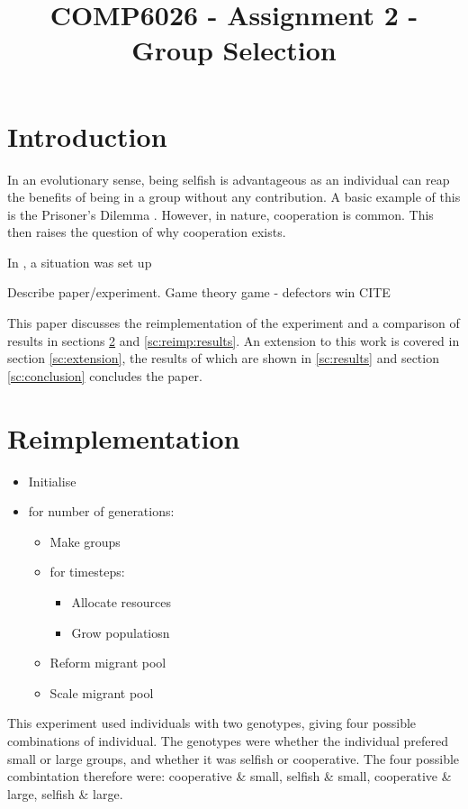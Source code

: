 \documentclass[11pt]{ecsarticle}
\title{COMP6026 - Assignment 2 - Group Selection}
\begin{document}
\maketitle
 
\section{Introduction}

In an evolutionary sense, being selfish is advantageous \cite{} as an individual can reap the benefits of being in a group without any contribution.
A basic example of this is the Prisoner's Dilemma \cite{}.
However, in nature, cooperation is common. 
This then raises the question of why cooperation exists. 

In \cite{powers2007individual}, a situation was set up

Describe paper/experiment.
Game theory game - defectors win CITE

This paper discusses the reimplementation of the experiment \cite{powers2007individual} and a comparison of results in sections \ref{sc:reimplementation} and \ref{sc:reimp:results}.
An extension to this work is covered in section \ref{sc:extension}, the results of which are shown in \ref{sc:results} and section \ref{sc:conclusion} concludes the paper.


\section{Reimplementation}\label{sc:reimplementation}
\begin{itemize}
 \item Initialise
 \item for number of generations:
 \begin{itemize}
  \item Make groups
  \item for timesteps:
  \begin{itemize}
   \item Allocate resources
   \item Grow populatiosn
  \end{itemize}
  \item Reform migrant pool
  \item Scale migrant pool
 \end{itemize}

\end{itemize}


This experiment used individuals with two genotypes, giving four possible combinations of individual.
The genotypes were whether the individual prefered small or large groups, and whether it was selfish or cooperative.
The four possible combintation therefore were: cooperative \& small, selfish \& small, cooperative \& large, selfish \& large. 
\end{document}

